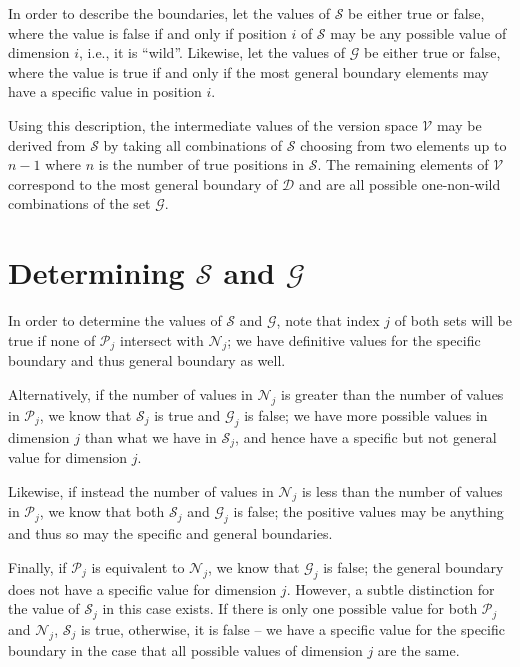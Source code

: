 In order to describe the boundaries, let the values of $\mathcal{S}$ be either true or false, where the value is false if and only if position $i$ of $\mathcal{S}$ may be any possible value of dimension $i$, i.e., it is ``wild''.  Likewise, let the values of $\mathcal{G}$ be either true or false, where the value is true if and only if the most general boundary elements may have a specific value in position $i$.

Using this description, the intermediate values of the version space $\mathcal{V}$ may be derived from $\mathcal{S}$ by taking all combinations of $\mathcal{S}$ choosing from two elements up to $n-1$ where $n$ is the number of true positions in $\mathcal{S}$.  The remaining elements of $\mathcal{V}$ correspond to the most general boundary of $\mathcal{D}$ and are all possible one-non-wild combinations of the set $\mathcal{G}$.

\section*{Determining $\mathcal{S}$ and $\mathcal{G}$}

In order to determine the values of $\mathcal{S}$ and $\mathcal{G}$, note that index $j$ of both sets will be true if none of $\mathcal{P}_j$ intersect with $\mathcal{N}_j$; we have definitive values for the specific boundary and thus general boundary as well.  

Alternatively, if the number of values in $\mathcal{N}_j$ is greater than the number of values in $\mathcal{P}_j$, we know that $\mathcal{S}_j$ is true and $\mathcal{G}_j$ is false; we have more possible values in dimension $j$ than what we have in $\mathcal{S}_j$, and hence have a specific but not general value for dimension $j$.  

Likewise, if instead the number of values in $\mathcal{N}_j$ is less than the number of values in $\mathcal{P}_j$, we know that both $\mathcal{S}_j$ and $\mathcal{G}_j$ is false; the positive values may be anything and thus so may the specific and general boundaries.  

Finally, if $\mathcal{P}_j$ is equivalent to $\mathcal{N}_j$, we know that $\mathcal{G}_j$ is false; the general boundary does not have a specific value for dimension $j$.  However, a subtle distinction for the value of $\mathcal{S}_j$ in this case exists.  If there is only one possible value for both $\mathcal{P}_j$ and $\mathcal{N}_j$, $\mathcal{S}_j$ is true, otherwise, it is false -- we have a specific value for the specific boundary in the case that all possible values of dimension $j$ are the same.


